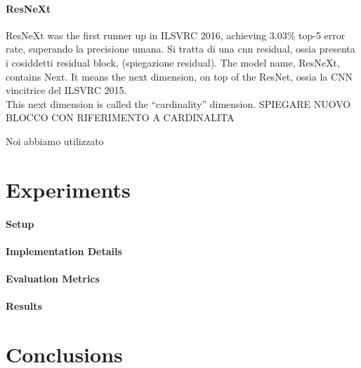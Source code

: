 \documentclass{article}
\begin{document}
\paragraph{ResNeXt}
ResNeXt was the first runner up in ILSVRC 2016, achieving 3.03\% top-5 error rate, superando la precisione umana.
Si tratta di una cnn residual, ossia presenta i cosiddetti residual block, (spiegazione residual).
The model name, ResNeXt, contains Next. It means the next dimension, on top of the ResNet, ossia la CNN vincitrice del  ILSVRC 2015. \\
This next dimension is called the “cardinality” dimension.
SPIEGARE NUOVO BLOCCO CON RIFERIMENTO A CARDINALITA

Noi abbiamo utilizzato 

\section{Experiments}\label{experiments}

\paragraph{Setup}

\paragraph{Implementation Details}

\paragraph{Evaluation Metrics}

\paragraph{Results}




\section{Conclusions}\label{conclusions}
\end{document}
